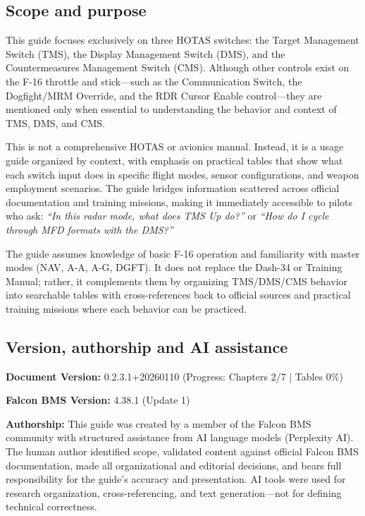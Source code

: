 \documentclass[11pt,a4paper]{article}
\newcommand{\docversion}{0.2.3.1}
\newcommand{\docbuild}{20260110}
\newcommand{\chapterscompletedof}{2/7}
\newcommand{\tablesfilledpct}{0\%}
\newcommand{\fulldocversion}{\docversion+\docbuild}
\begin{document}
\subsection{Scope and purpose}

This guide focuses exclusively on three HOTAS switches: the Target Management Switch (TMS), the Display Management Switch (DMS), and the Countermeasures Management Switch (CMS). Although other controls exist on the F-16 throttle and stick---such as the Communication Switch, the Dogfight/MRM Override, and the RDR Cursor Enable control---they are mentioned only when essential to understanding the behavior and context of TMS, DMS, and CMS.

This is not a comprehensive HOTAS or avionics manual. Instead, it is a usage guide organized by context, with emphasis on practical tables that show what each switch input does in specific flight modes, sensor configurations, and weapon employment scenarios. The guide bridges information scattered across official documentation and training missions, making it immediately accessible to pilots who ask: \emph{``In this radar mode, what does TMS Up do?''} or \emph{``How do I cycle through MFD formats with the DMS?''}

The guide assumes knowledge of basic F-16 operation and familiarity with master modes (NAV, A-A, A-G, DGFT). It does not replace the Dash-34 or Training Manual; rather, it complements them by organizing TMS/DMS/CMS behavior into searchable tables with cross-references back to official sources and practical training missions where each behavior can be practiced.

\subsection{Version, authorship and AI assistance}

\textbf{Document Version:} \fulldocversion{} (Progress: Chapters \chapterscompletedof{} | Tables \tablesfilledpct)

\textbf{Falcon BMS Version:} 4.38.1 (Update 1)

\textbf{Authorship:} This guide was created by a member of the Falcon BMS community with structured assistance from AI language models (Perplexity AI). The human author identified scope, validated content against official Falcon BMS documentation, made all organizational and editorial decisions, and bears full responsibility for the guide's accuracy and presentation. AI tools were used for research organization, cross-referencing, and text generation---not for defining technical correctness.
\end{document}
